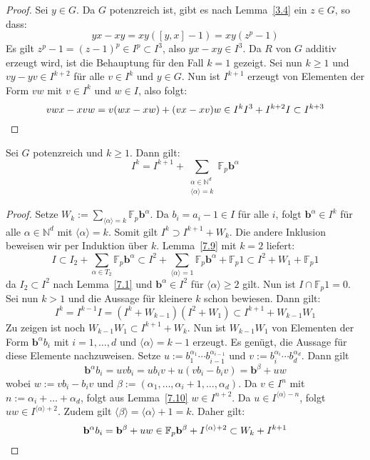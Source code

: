 \documentclass[11pt,a4paper,openany]{memoir}
\begin{document}
\begin{proof}
Sei $y\in G$. Da $G$ potenzreich ist, gibt es nach Lemma~\ref{3.4} ein $z\in G$, so dass:
\[yx-xy=xy([y,x]-1)=xy(z^p-1) \]
Es gilt $z^p-1=(z-1)^p\in I^p\subset I^3$, also $yx-xy\in I^3$. Da $R$ von $G$ additiv erzeugt wird, ist die Behauptung für den Fall $k=1$ gezeigt. Sei nun $k\geq 1$ und $vy-yv\in I^{k+2}$ für alle $v\in I^{k}$ und $y\in G$. Nun ist $I^{k+1}$ erzeugt von Elementen der Form $vw$ mit $v\in I^{k}$ und $w\in I$, also folgt:
\[vwx-xvw=v(wx-xw)+(vx-xv)w\in I^{k}I^3+ I^{k+2}I\subset I^{k+3}\qedhere \]
\end{proof}

\begin{proposition}\label{7.11}
Sei $G$ potenzreich und $k\geq 1$. Dann gilt:
\[ I^k = I^{k+1}+\sum_{\substack{\alpha\in\mathbb{N}^d\\\langle\alpha\rangle =k}}\mathbb{F}_p \mathbf{b}^\alpha \]
\end{proposition}

\begin{proof}
Setze $W_k:=\sum_{\langle\alpha\rangle =k}\mathbb{F}_p\mathbf{b}^\alpha$. Da $b_i=a_i-1\in I$ für alle $i$, folgt $\mathbf{b}^\alpha\in I^k$ für alle $\alpha\in\mathbb{N}^d$ mit $\langle\alpha\rangle=k$. Somit gilt $I^k\supset I^{k+1}+W_k$. Die andere Inklusion beweisen wir per Induktion über $k$. Lemma~\ref{7.9} mit $k=2$ liefert:
\[I\subset I_2+\sum_{\alpha\in T_2}\mathbb{F}_p\mathbf{b}^\alpha\subset I^2+\sum_{\langle\alpha\rangle =1}\mathbb{F}_p\mathbf{b}^\alpha+\mathbb{F}_p 1\subset I^2+W_1+\mathbb{F}_p1 \]
da $I_2\subset I^2$ nach Lemma~\ref{7.1} und $\mathbf{b}^\alpha\in I^2$ für $\langle\alpha\rangle\geq 2$ gilt. Nun ist $I\cap\mathbb{F}_p1=0$. Sei nun $k>1$ und die Aussage für kleinere $k$ schon bewiesen. Dann gilt:
\[I^k = I^{k-1} I=(I^k+W_{k-1})(I^2+W_1)\subset I^{k+1}+W_{k-1}W_1 \]
Zu zeigen ist noch $W_{k-1}W_1\subset I^{k+1}+W_k$. Nun ist $W_{k-1}W_1$ von Elementen der Form $\mathbf{b}^\alpha b_i$ mit $i=1,\ldots,d$ und $\langle\alpha\rangle =k-1$ erzeugt. Es genügt, die Aussage für diese Elemente nach\-zu\-wei\-sen. Setze $u:= b_1^{\alpha_1}\cdots b_{i-1}^{\alpha_{i-1}}$ und $v:=b_i^{\alpha_i}\cdots b_d^{\alpha_d}$. Dann gilt
\[\mathbf{b}^\alpha b_i=uvb_i=ub_iv+u(vb_i-b_iv)=\mathbf{b}^\beta+uw \]
wobei $w:=vb_i-b_iv$ und $\beta:=(\alpha_1,\ldots,\alpha_i+1,\ldots, \alpha_d)$. Da $v\in I^n$ mit $n:=\alpha_i+\ldots+\alpha_d$, folgt aus Lemma~\ref{7.10} $w\in I^{n+2}$. Da $u\in I^{\langle\alpha\rangle -n}$, folgt $uw\in I^{\langle\alpha\rangle+2}$. Zudem gilt $\langle\beta\rangle = \langle\alpha\rangle+1=k$. Daher gilt:
\[\mathbf{b}^\alpha b_i=\mathbf{b}^\beta+uw \in \mathbb{F}_p \mathbf{b}^\beta+ I^{\langle\alpha\rangle+2}\subset W_k+ I^{k+1} \qedhere \]
\end{proof}
\end{document}
